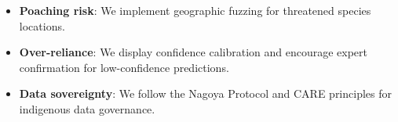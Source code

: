 \begin{itemize}
  \item \textbf{Poaching risk}: We implement geographic fuzzing for
    threatened species locations.
  \item \textbf{Over-reliance}: We display confidence calibration and
    encourage expert confirmation for low-confidence predictions.
  \item \textbf{Data sovereignty}: We follow the Nagoya Protocol and
    CARE principles for indigenous data governance.
\end{itemize}


